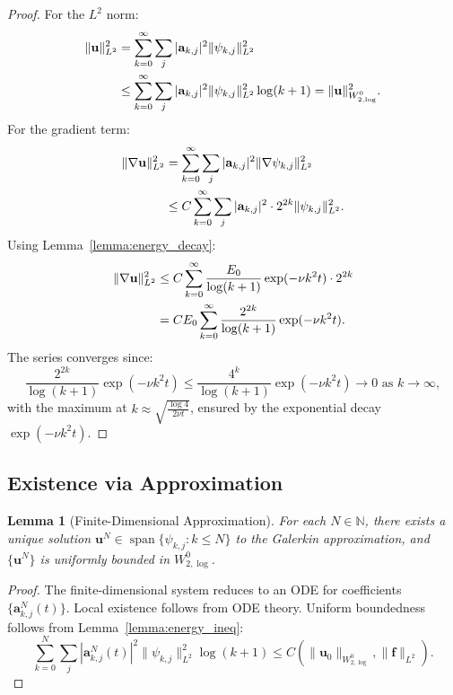 \documentclass[12pt]{article}
\newtheorem{lemma}[theorem]{Lemma}
\begin{document}
\begin{proof}
For the $L^2$ norm:
\begin{align}
\|\mathbf{u}\|^2_{L^2} &= \sum_{k=0}^\infty \sum_j |\mathbf{a}_{k,j}|^2 
\|\psi_{k,j}\|^2_{L^2} \notag \\
&\leq \sum_{k=0}^\infty \sum_j |\mathbf{a}_{k,j}|^2 \|\psi_{k,j}\|^2_{L^2} 
\log(k + 1) = \|\mathbf{u}\|^2_{W^0_{2,\log}}.
\end{align}
For the gradient term:
\begin{align}
\|\nabla \mathbf{u}\|^2_{L^2} &= \sum_{k=0}^\infty \sum_j |\mathbf{a}_{k,j}|^2 
\|\nabla \psi_{k,j}\|^2_{L^2} \notag \\
&\leq C \sum_{k=0}^\infty \sum_j |\mathbf{a}_{k,j}|^2 \cdot 2^{2k} 
\|\psi_{k,j}\|^2_{L^2}.
\end{align}
Using Lemma~\ref{lemma:energy_decay}:
\begin{align}
\|\nabla \mathbf{u}\|^2_{L^2} &\leq C \sum_{k=0}^\infty \frac{E_0}{\log(k + 1)} 
\exp(-\nu k^2 t) \cdot 2^{2k} \notag \\
&= C E_0 \sum_{k=0}^\infty \frac{2^{2k}}{\log(k + 1)} \exp(-\nu k^2 t).
\end{align}
The series converges since:
\begin{equation}
\frac{2^{2k}}{\log(k + 1)} \exp(-\nu k^2 t) \leq \frac{4^k}{\log(k + 1)} 
\exp(-\nu k^2 t) \to 0 \text{ as } k \to \infty,
\end{equation}
with the maximum at $k \approx \sqrt{\frac{\log 4}{2\nu t}}$, ensured by the 
exponential decay $\exp(-\nu k^2 t)$.
\end{proof}

\subsection{Existence via Approximation}
\begin{lemma}[Finite-Dimensional Approximation]
\label{lemma:galerkin}
For each $N \in \mathbb{N}$, there exists a unique solution 
$\mathbf{u}^N \in \operatorname{span}\{\psi_{k,j} : k \leq N\}$ to the 
Galerkin approximation, and $\{\mathbf{u}^N\}$ is uniformly bounded in 
$W^0_{2,\log}$.
\end{lemma}

\begin{proof}
The finite-dimensional system reduces to an ODE for coefficients 
$\{\mathbf{a}_{k,j}^N(t)\}$. Local existence follows from ODE theory. 
Uniform boundedness follows from Lemma~\ref{lemma:energy_ineq}:
\begin{equation}
\sum_{k=0}^N \sum_j |\mathbf{a}_{k,j}^N(t)|^2 \|\psi_{k,j}\|^2_{L^2} \log(k + 1) 
\leq C(\|\mathbf{u}_0\|_{W^0_{2,\log}}, \|\mathbf{f}\|_{L^2}).
\end{equation}
\end{proof}
\end{document}
